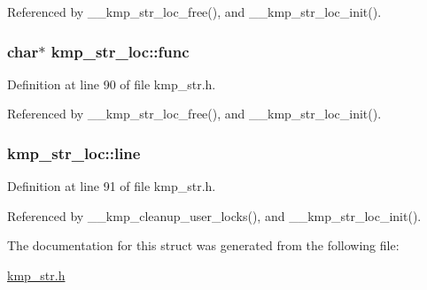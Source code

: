 Referenced by \-\_\-\-\_\-kmp\-\_\-str\-\_\-loc\-\_\-free(), and \-\_\-\-\_\-kmp\-\_\-str\-\_\-loc\-\_\-init().

\hypertarget{structkmp__str__loc_a92f2014d7206fbd45d62f1095fb9e575}{
\subsubsection[{func}]{\setlength{\rightskip}{0pt plus 5cm}char$\ast$ kmp\-\_\-str\-\_\-loc\-::func}}\label{structkmp__str__loc_a92f2014d7206fbd45d62f1095fb9e575}


Definition at line 90 of file kmp\-\_\-str.\-h.



Referenced by \-\_\-\-\_\-kmp\-\_\-str\-\_\-loc\-\_\-free(), and \-\_\-\-\_\-kmp\-\_\-str\-\_\-loc\-\_\-init().

\hypertarget{structkmp__str__loc_a225be91d4582b0393c41f1fbfdbea683}{
\subsubsection[{line}]{ kmp\-\_\-str\-\_\-loc\-::line}}\label{structkmp__str__loc_a225be91d4582b0393c41f1fbfdbea683}


Definition at line 91 of file kmp\-\_\-str.\-h.



Referenced by \-\_\-\-\_\-kmp\-\_\-cleanup\-\_\-user\-\_\-locks(), and \-\_\-\-\_\-kmp\-\_\-str\-\_\-loc\-\_\-init().



The documentation for this struct was generated from the following file\-:\begin{DoxyCompactItemize}
\item 
\hyperlink{kmp__str_8h}{kmp\-\_\-str.\-h}\end{DoxyCompactItemize}
